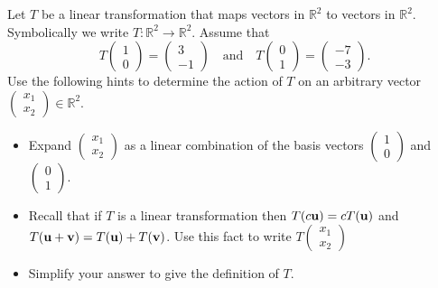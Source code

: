 \begin{problem}
    Let $T$ be a linear transformation that maps vectors in $\mathbb{R}^2$ to vectors in
    $\mathbb{R}^2$.  Symbolically we write $T: \mathbb{R}^2 \to \mathbb{R}^2$.  Assume
    that 
    \[ T\begin{pmatrix} 1 \\ 0 \end{pmatrix} = \begin{pmatrix} 3 \\ -1 \end{pmatrix} \quad
            \text{and} \quad T\begin{pmatrix} 0 \\ 1 \end{pmatrix} = \begin{pmatrix} -7 \\
                -3 \end{pmatrix}. \]
    Use the following hints to determine the action of $T$ on an arbitrary vector
    $\begin{pmatrix} x_1 \\ x_2 \end{pmatrix} \in \mathbb{R}^2$.
        \begin{itemize}
            \item Expand $\begin{pmatrix}x_1\\x_2\end{pmatrix}$ as a linear combination of
                    the basis vectors $\begin{pmatrix}1\\0\end{pmatrix}$ and
                        $\begin{pmatrix}0\\1\end{pmatrix}$.
            \item Recall that if $T$ is a linear transformation then $T(c {\bf u}) = cT({\bf u})$ and
                $T({\bf u}+{\bf v}) = T({\bf u}) + T({\bf v})$.  Use this fact to write
                $T\begin{pmatrix}x_1\\x_2\end{pmatrix}$
            \item Simplify your answer to give the definition of $T$.
        \end{itemize}
\end{problem}
